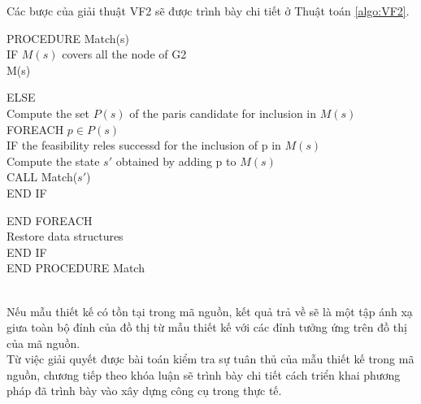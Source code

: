 \documentclass[12pt]{report}
\newenvironment{thuattoan}[1][h]
  {\renewcommand{\algorithmcfname}{Thuật toán}
   \begin{algorithm}[#1]
  }{\end{algorithm}}
\begin{document}
\newpage
\noindent Các bược của giải thuật VF2 \cite{vf2_1368} sẽ được trình bày chi tiết ở Thuật toán \ref{algo:VF2}.
\begin{thuattoan}[!htbp]
	\label{algo:VF2}
	\caption{$VF2$}
	PROCEDURE Match(s)\\
	\hspace{5mm}
	\hspace{5mm}
	\hspace{5mm}IF $M(s)$ covers all the node of G2\\
	\hspace{10mm} \Return M(s)
	
	\hspace{5mm}ELSE\\
	\hspace{10mm} Compute the set $P(s)$ of the paris candidate for inclusion in $M(s)$\\
	\hspace{10mm} FOREACH	$p \in P(s)$ \\
	\hspace{10mm} IF the feasibility reles successd for the inclusion of p in $M(s)$\\
	\hspace{20mm} Compute the state $s'$ obtained by adding p to $M(s)$\\
	\hspace{20mm} CALL Match($s'$)\\
	
	\hspace{15mm} END IF
	
	\hspace{10mm}END FOREACH\\
	\hspace{10mm}Restore data structures\\
	\hspace{5mm}END IF\\
	END PROCEDURE Match
\end{thuattoan}\\
Nếu mẫu thiết kế có tồn tại trong mã nguồn, kết quả trả về sẽ là một tập ánh xạ giưa toàn bộ đỉnh của đồ thị từ mẫu thiết kế với các đỉnh tưởng ứng trên đồ thị của mã nguồn.\\
Từ việc giải quyết được bài toán kiểm tra sự tuân thủ của mẫu thiết kế trong mã nguồn, chương tiếp theo khóa luận sẽ trình bày chi tiết cách triển khai phương pháp đã trình bày vào xây dựng công cụ trong thực tế.
\end{document}
